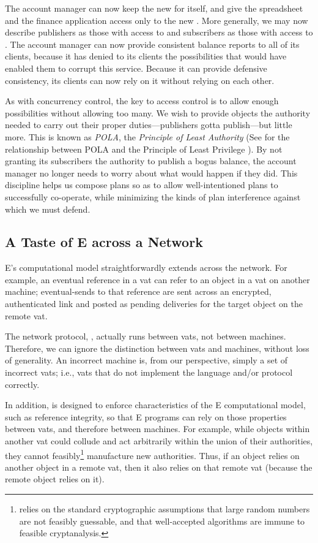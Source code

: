 \documentclass{llncs}
\begin{document}
The account manager can now keep the new  for
itself, and give the spreadsheet and the finance application access
only to the new . More generally, we may now
describe publishers as those with access to  and
subscribers as those with access to . The account
manager can now provide consistent balance reports to all of its
clients, because it has denied to its clients the possibilities that
would have enabled them to corrupt this service. Because it can
provide defensive consistency, its clients can now rely on it without
relying on each other.

As with concurrency control, the key to access control is to allow
enough possibilities without allowing too many. We wish to provide
objects the authority needed to carry out their proper
duties---publishers gotta publish---but little more. This is known as
\emph{POLA}, the \emph{Principle of Least Authority} (See
\cite{miller:paradigm} for the relationship between POLA and the
Principle of Least Privilege \cite{SaltzerSc75}). By not granting its
subscribers the authority to publish a bogus balance, the account
manager no longer needs to worry about what would happen if they
did. This discipline helps us compose plans so as to allow
well-intentioned plans to successfully co-operate, while minimizing
the kinds of plan interference against which we must defend.

\subsection{A Taste of E across a Network}

E's computational model straightforwardly extends across the network.
For example, an eventual reference in a vat can refer to an object in
a vat on another machine; eventual-sends to that reference are sent
across an encrypted, authenticated link and posted as pending
deliveries for the target object on the remote vat.

The network protocol, , actually runs between vats, not
between machines. Therefore, we can ignore the distinction between vats
and machines, without loss of generality. An incorrect machine is,
from our perspective, simply a set of incorrect vats; i.e., vats that
do not implement the language and/or protocol correctly.

In addition,  is designed to enforce characteristics of
the E computational model, such as reference integrity, so that E
programs can rely on those properties between vats, and therefore
between machines. For example, while objects within another vat could
collude and act arbitrarily within the union of their authorities,
they cannot feasibly\footnote{
%
 relies on the standard cryptographic assumptions that
large random numbers are not feasibly guessable, and that
well-accepted algorithms are immune to feasible cryptanalysis.}
%
manufacture new authorities. Thus, if an object relies on another
object in a remote vat, then it also relies on that remote vat
(because the remote object relies on it).
\end{document}
